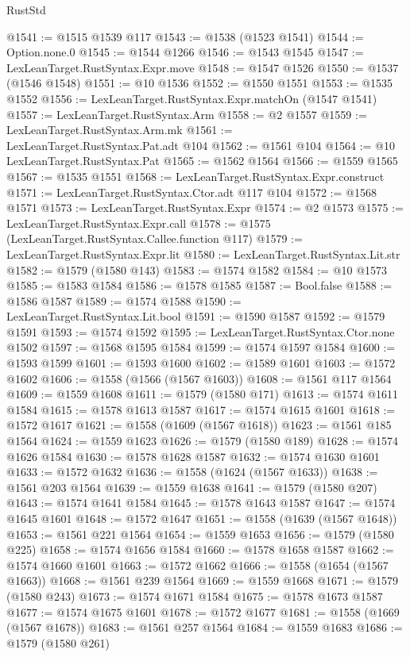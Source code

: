 \begin{lexlean}{RustStd}
\begin{coremodule}
@1541 := @1515 @1539 @117
@1543 := @1538 (@1523 @1541)
@1544 := Option.none.{0}
@1545 := @1544 @1266
@1546 := @1543 @1545
@1547 := LexLeanTarget.RustSyntax.Expr.move
@1548 := @1547 @1526
@1550 := @1537 (@1546 @1548)
@1551 := @10 @1536
@1552 := @1550 @1551
@1553 := @1535 @1552
@1556 := LexLeanTarget.RustSyntax.Expr.matchOn (@1547 @1541)
@1557 := LexLeanTarget.RustSyntax.Arm
@1558 := @2 @1557
@1559 := LexLeanTarget.RustSyntax.Arm.mk
@1561 := LexLeanTarget.RustSyntax.Pat.adt @104
@1562 := @1561 @104
@1564 := @10 LexLeanTarget.RustSyntax.Pat
@1565 := @1562 @1564
@1566 := @1559 @1565
@1567 := @1535 @1551
@1568 := LexLeanTarget.RustSyntax.Expr.construct
@1571 := LexLeanTarget.RustSyntax.Ctor.adt @117 @104
@1572 := @1568 @1571
@1573 := LexLeanTarget.RustSyntax.Expr
@1574 := @2 @1573
@1575 := LexLeanTarget.RustSyntax.Expr.call
@1578 := @1575 (LexLeanTarget.RustSyntax.Callee.function @117)
@1579 := LexLeanTarget.RustSyntax.Expr.lit
@1580 := LexLeanTarget.RustSyntax.Lit.str
@1582 := @1579 (@1580 @143)
@1583 := @1574 @1582
@1584 := @10 @1573
@1585 := @1583 @1584
@1586 := @1578 @1585
@1587 := Bool.false
@1588 := @1586 @1587
@1589 := @1574 @1588
@1590 := LexLeanTarget.RustSyntax.Lit.bool
@1591 := @1590 @1587
@1592 := @1579 @1591
@1593 := @1574 @1592
@1595 := LexLeanTarget.RustSyntax.Ctor.none @1502
@1597 := @1568 @1595 @1584
@1599 := @1574 @1597 @1584
@1600 := @1593 @1599
@1601 := @1593 @1600
@1602 := @1589 @1601
@1603 := @1572 @1602
@1606 := @1558 (@1566 (@1567 @1603))
@1608 := @1561 @117 @1564
@1609 := @1559 @1608
@1611 := @1579 (@1580 @171)
@1613 := @1574 @1611 @1584
@1615 := @1578 @1613 @1587
@1617 := @1574 @1615 @1601
@1618 := @1572 @1617
@1621 := @1558 (@1609 (@1567 @1618))
@1623 := @1561 @185 @1564
@1624 := @1559 @1623
@1626 := @1579 (@1580 @189)
@1628 := @1574 @1626 @1584
@1630 := @1578 @1628 @1587
@1632 := @1574 @1630 @1601
@1633 := @1572 @1632
@1636 := @1558 (@1624 (@1567 @1633))
@1638 := @1561 @203 @1564
@1639 := @1559 @1638
@1641 := @1579 (@1580 @207)
@1643 := @1574 @1641 @1584
@1645 := @1578 @1643 @1587
@1647 := @1574 @1645 @1601
@1648 := @1572 @1647
@1651 := @1558 (@1639 (@1567 @1648))
@1653 := @1561 @221 @1564
@1654 := @1559 @1653
@1656 := @1579 (@1580 @225)
@1658 := @1574 @1656 @1584
@1660 := @1578 @1658 @1587
@1662 := @1574 @1660 @1601
@1663 := @1572 @1662
@1666 := @1558 (@1654 (@1567 @1663))
@1668 := @1561 @239 @1564
@1669 := @1559 @1668
@1671 := @1579 (@1580 @243)
@1673 := @1574 @1671 @1584
@1675 := @1578 @1673 @1587
@1677 := @1574 @1675 @1601
@1678 := @1572 @1677
@1681 := @1558 (@1669 (@1567 @1678))
@1683 := @1561 @257 @1564
@1684 := @1559 @1683
@1686 := @1579 (@1580 @261)

\end{coremodule}
\end{lexlean}
